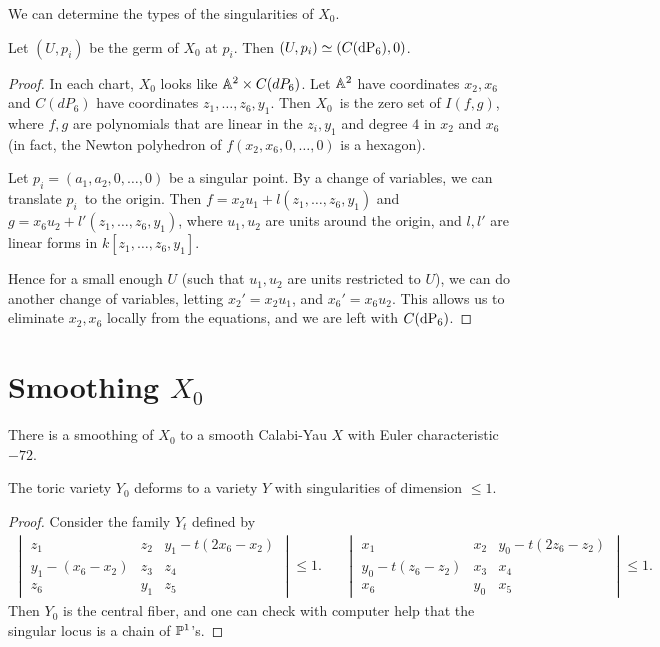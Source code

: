 We can determine the types of the singularities of $X_0$.

\begin{lemma}
Let $(U,p_i)$ be the germ of $X_0$ at $p_i$. Then $(U,p_i) \simeq (C(\dP6),0)$.
\end{lemma}
\begin{proof}
In each chart, $X_0$ looks like $\mathbb{A}^2 \times C(dP_6)$. Let $\mathbb{A}^2$ have coordinates $x_2,x_6$ and $C(dP_6)$ have coordinates $z_1,\ldots,z_6,y_1$. Then $X_0$ is the zero set of $I(f,g)$, where $f,g$ are polynomials that are linear in the $z_i,y_1$ and degree $4$ in $x_2$ and $x_6$ (in fact, the Newton polyhedron of $f(x_2,x_6,0,\ldots,0)$ is a hexagon).

Let $p_i=(a_1,a_2,0,\ldots,0)$ be a singular point. By a change of variables, we can translate $p_i$ to the origin. Then $f=x_2u_1+l(z_1,\ldots,z_6,y_1)$ and $g=x_6u_2 + l'(z_1,\ldots,z_6,y_1)$, where $u_1,u_2$ are units around the origin, and $l,l'$ are linear forms in $k[z_1,\ldots,z_6,y_1]$.

Hence for a small enough $U$ (such that $u_1,u_2$ are units restricted to $U$), we can do another change of variables, letting $x_2'=x_2u_1$, and $x_6'=x_6u_2$. This allows us to eliminate $x_2,x_6$ locally from the equations, and we are left with $C(\dP6)$.
\end{proof}


\section{Smoothing $X_0$}

There is a smoothing of $X_0$ to a smooth Calabi-Yau $X$ with Euler characteristic $-72$.

\begin{lemma}
The toric variety $Y_0$ deforms to a variety $Y$ with singularities of dimension $\leq 1$.
\end{lemma}
\begin{proof}
Consider the family $Y_t$ defined by
\begin{align*}
\begin{vmatrix}
z_1 & z_2 & y_1 - t(2x_6-x_2) \\
y_1-(x_6-x_2) & z_3 & z_4 \\
z_6 & y_1 & z_5
\end{vmatrix} \leq 1.
&&
\begin{vmatrix}
x_1 & x_2 & y_0 - t(2z_6-z_2) \\
y_0-t(z_6-z_2) & x_3 & x_4 \\
x_6 & y_0 & x_5
\end{vmatrix} \leq 1.
\end{align*}
Then $Y_0$ is the central fiber, and one can check with computer help that the singular locus is a chain of $\mathbb{P}^1$'s.
\end{proof}

